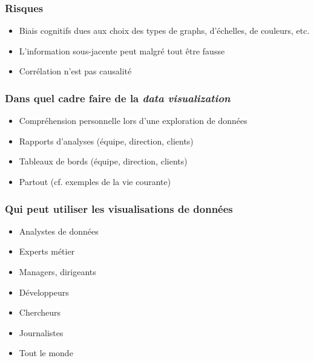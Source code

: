 \begin{frame}\frametitle{Risques}
   \begin{itemize}
      \item Biais cognitifs dues aux choix des types de graphs, d'échelles, de couleurs, etc.
      \item L'information sous-jacente peut malgré tout être fausse
      \item Corrélation n'est pas causalité
   \end{itemize}
\end{frame}



\begin{frame}\frametitle{Dans quel cadre faire de la \textit{data visualization}}
   \begin{itemize}
         \item Compréhension personnelle lors d'une exploration de données
         \item Rapports d'analyses (équipe, direction, clients)
         \item Tableaux de bords (équipe, direction, clients)
         \item Partout (cf. exemples de la vie courante)
   \end{itemize}
\end{frame}

\begin{frame}\frametitle{Qui peut utiliser les visualisations de données}
   \begin{itemize}
      \item Analystes de données
      \item Experts métier
      \item Managers, dirigeants
      \item Développeurs
      \item Chercheurs
      \item Journalistes
      \item Tout le monde
   \end{itemize}
\end{frame}



